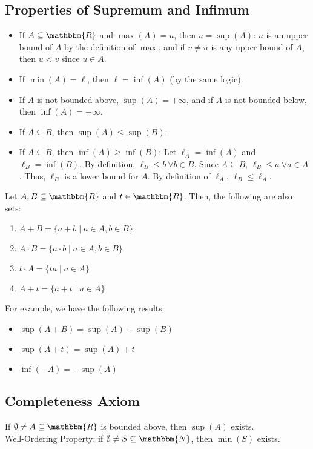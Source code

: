 \documentclass[10pt]{extarticle}
\newcommand{\N}{\mathbbm{N}}
\newcommand{\R}{\mathbbm{R}}
\begin{document}
  \subsection{Properties of Supremum and Infimum}%
    \begin{itemize}
      \item If $A \subseteq \R$ and $\max(A) = u$, then $u = \sup(A)$: $u$ is an upper bound of $A$ by the definition of $\max$, and if $v\neq u$ is any upper bound of $A$, then $u < v$ since $u\in A$.
      \item If $\min(A) = \ell$, then $\ell = \inf(A)$ (by the same logic).
      \item If $A$ is not bounded above, $\sup(A) = +\infty$, and if $A$ is not bounded below, then $\inf(A) = -\infty$.
      \item If $A\subseteq B$, then $\sup(A) \leq \sup(B)$.
      \item If $A\subseteq B$, then $\inf(A) \geq \inf(B)$: Let $\ell_A = \inf(A)$ and $\ell_B = \inf(B)$. By definition, $\ell_B \leq b~\forall b\in B$. Since $A\subseteq B$, $\ell_B \leq a~\forall a\in A$. Thus, $\ell_B$ is a lower bound for $A$. By definition of $\ell_A$, $\ell_B \leq \ell_A$.
    \end{itemize}
    Let $A,B\subseteq \R$ and $t\in\R$. Then, the following are also sets:
    \begin{enumerate}[(1)]
      \item $A + B = \{a+b\mid a\in A,b\in B\}$
      \item $A\cdot B = \{a\cdot b\mid a\in A,b\in B\}$
      \item $t\cdot A = \{ta\mid a\in A\}$
      \item $A + t = \{a+t\mid a\in A\}$
    \end{enumerate}
    For example, we have the following results:
    \begin{itemize}
      \item $\sup(A+B) = \sup(A) + \sup(B)$
      \item $\sup(A+t) = \sup(A) + t$
      \item $\inf(-A) = -\sup(A)$
    \end{itemize}
  \subsection{Completeness Axiom}%
    If $\emptyset\neq A\subseteq \R$ is bounded above, then $\sup(A)$ exists.\\

    Well-Ordering Property: if $\emptyset \neq S\subseteq \N$, then $\min(S)$ exists.\\
\end{document}
